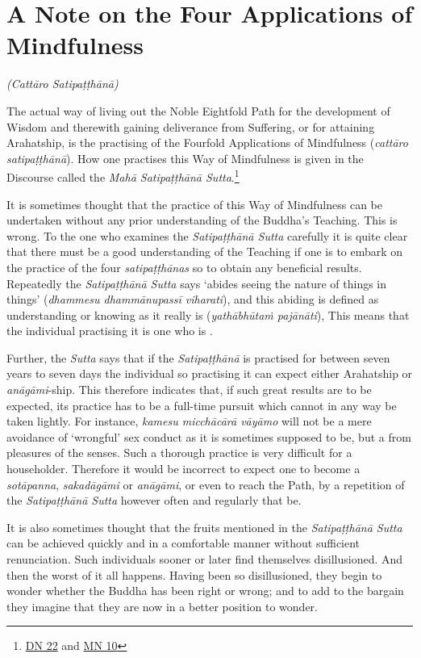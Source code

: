 \chapter{A Note on the Four Applications of Mindfulness}

\emph{(Cattāro Satipaṭṭhānā)}

\protect\hypertarget{start}{}{}The actual way of living out the Noble Eightfold Path for the development of Wisdom and therewith gaining deliverance from Suffering, or for attaining Arahatship, is the practising of the Fourfold Applications of Mindfulness (\emph{cattāro satipaṭṭhānā}). How one practises this Way of Mindfulness is given in the Discourse called the \emph{Mahā Satipaṭṭhānā Sutta}.\footnote{\href{https://suttacentral.net/dn22/en/sujato}{DN 22} and \href{https://suttacentral.net/mn10/en/sujato}{MN 10}}

It is sometimes thought that the practice of this Way of Mindfulness can be undertaken without any prior understanding of the Buddha's Teaching. This is wrong. To the one who examines the \emph{Satipaṭṭhānā Sutta} carefully it is quite clear that there must be a good understanding of the Teaching if one is to embark on the practice of the four \emph{satipaṭṭhānas} so to obtain any beneficial results. Repeatedly the \emph{Satipaṭṭhānā Sutta} says `abides seeing the nature of things in things' (\emph{dhammesu dhammānupassī viharati}), and this abiding is defined as understanding or knowing as it really is (\emph{yathābhūtaṁ pajānāti}), This means that the individual practising it is one who is .

Further, the \emph{Sutta} says that if the \emph{Satipaṭṭhānā} is practised for between seven years to seven days the individual so practising it can expect either Arahatship or \emph{anāgāmi}-ship. This therefore indicates that, if such great results are to be expected, its practice has to be a full-time pursuit which cannot in any way be taken lightly. For instance, \emph{kamesu micchācārā vāyāmo} will not be a mere avoidance of `wrongful' sex conduct as it is sometimes supposed to be, but a  from  pleasures of the senses. Such a thorough practice is very difficult for a householder. Therefore it would be incorrect to expect one to become a \emph{sotāpanna}, \emph{sakadāgāmi} or \emph{anāgāmi}, or even to reach the Path, by a repetition of the \emph{Satipaṭṭhānā Sutta} however often and regularly that be.

It is also sometimes thought that the fruits mentioned in the \emph{Satipaṭṭhānā Sutta} can be achieved quickly and in a comfortable manner without sufficient renunciation. Such individuals sooner or later find themselves disillusioned. And then the worst of it all happens. Having been so disillusioned, they begin to wonder whether the Buddha has been right or wrong; and to add to the bargain they imagine that they are now in a better position to wonder.

